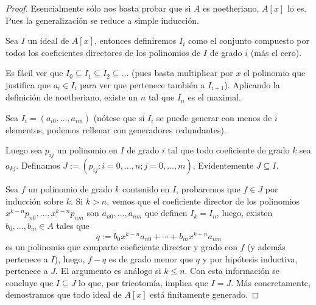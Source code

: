 \documentclass[11pt,oneside]{book}
\begin{document}
\begin{proof}
Esencialmente sólo nos basta probar que si $A$ es noetheriano, $A[x]$ lo es. Pues la generalización se reduce a simple inducción.

Sea $I$ un ideal de $A[x]$, entonces definiremos $I_i$ como el conjunto compuesto por todos los coeficientes directores de los polinomios de $I$ de grado $i$ (más el cero).

Es fácil ver que $I_0\subseteq I_1\subseteq I_2\subseteq\dots$ (pues basta multiplicar por $x$ el polinomio que justifica que $a_i\in I_i$ para ver que pertenece también a $I_{i+1}$). Aplicando la definición de noetheriano, existe un $n$ tal que $I_n$ es el maximal.

Sea $I_i=(a_{i0},\dots,a_{im})$ (nótese que si $I_i$ se puede generar con menos de $i$ elementos, podemos rellenar con generadores redundantes).

Luego sea $p_{ij}$ un polinomio en $I$ de grado $i$ tal que todo coeficiente de grado $k$ sea $a_{kj}$. Definamos $J:=(p_{ij}:i=0,\dots,n;j=0,\dots,m)$. Evidentemente $J\subseteq I$.

Sea $f$ un polinomio de grado $k$ contenido en $I$, probaremos que $f\in J$ por inducción sobre $k$. Si $k\gt n$, vemos que el coeficiente director de los polinomios $x^{k-n}p_{n0},\dots,x^{k-n}p_{nm}$ son $a_{n0},\dots,a_{nm}$ que definen $I_k=I_n$, luego, existen $b_0,\dots,b_m\in A$ tales que
$$q:=b_0x^{k-n}a_{n0}+\cdots+b_mx^{k-n}a_{nm}$$
es un polinomio que comparte coeficiente director y grado con $f$ (y además pertenece a $I$), luego, $f-q$ es de grado menor que $q$ y por hipótesis inductiva, pertenece a $J$. El argumento es análogo si $k\leq n$. Con esta información se concluye que $I\subseteq J$ lo que, por tricotomía, implica que $I=J$. Más concretamente, demostramos que todo ideal de $A[x]$ está finitamente generado.
\end{proof}
\end{document}
